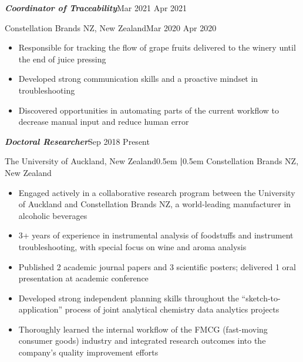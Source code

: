 \documentclass[11pt, a4paper, twoside]{article}
\newcommand{\Th}{\bgroup\fontencoding{OT1}\selectfont Th\egroup}
\begin{document}
  \begin{adjustwidth}{0.2\textwidth}{}
  \vspace{-1.825\baselineskip}
    \textbf{\large\itshape Coordinator of Traceability}\hfill Mar 2021 \textendash{} Apr 2021\par\vspace{-0.4ex}
    {\small Constellation Brands NZ, New Zealand}\hfill Mar 2020 \textendash{} Apr 2020\par\vspace{-0.8ex}
    \begin{itemize}
        \setlength\itemsep{-0.5ex}
        \item Responsible for tracking the flow of grape fruits delivered to the winery until the end of juice pressing 
        \item Developed strong communication skills and a proactive mindset in troubleshooting
        \item Discovered opportunities in automating parts of the current workflow to decrease manual input and reduce human error
    \end{itemize}\par\vspace{0.7ex}
    \textbf{\large\itshape Doctoral Researcher}\hfill Sep 2018 \textendash{} Present\par\vspace{-0.4ex}
    {\small \Th e University of Auckland, New Zealand\kern0.5em \textbf{|}\kern0.5em Constellation Brands NZ, New Zealand}\par\vspace{-0.8ex}
    \begin{itemize}
        \setlength\itemsep{-0.5ex}
        \item Engaged actively in a collaborative research program between the University of Auckland and Constellation Brands NZ, a world-leading manufacturer in alcoholic beverages
        \item 3+ years of experience in instrumental analysis of foodstuffs and instrument troubleshooting, with special focus on wine and aroma analysis
        \item Published 2 academic journal papers and 3 scientific posters; delivered 1 oral presentation at academic conference
        \item Developed strong independent planning skills throughout the ``sketch-to-application'' process of joint analytical chemistry \textendash{} data analytics projects
        \item Thoroughly learned the internal workflow of the FMCG (fast-moving consumer goods) industry and integrated research outcomes into the company's quality improvement efforts

\end{itemize}
\end{adjustwidth}
\end{document}
